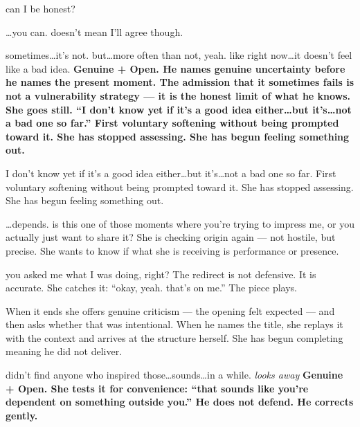 {can I be honest?}
{}

{\ldots you can. doesn't mean I'll agree though.}
{}

{sometimes\ldots it's not. but\ldots more often than not, yeah. 
like right now\ldots it doesn't feel like a bad idea.}
{\textbf{Genuine + Open. He names genuine uncertainty before he names the 
present moment. The admission that it sometimes fails is not a vulnerability 
strategy --- it is the honest limit of what he knows. She goes still. 
``I don't know yet if it's a good idea either\ldots but it's\ldots not a bad 
one so far.'' First voluntary softening without being prompted toward it. 
She has stopped assessing. She has begun feeling something out.}}

{I don't know yet if it's a good idea either\ldots but it's\ldots not a bad 
one so far.}
{First voluntary softening without being prompted toward it. 
She has stopped assessing. She has begun feeling something out.}

\thinrule

{\ldots depends. is this one of those moments where you're trying to impress 
me, or you actually just want to share it?}
{She is checking origin again --- not hostile, but precise. She wants to know 
if what she is receiving is performance or presence.}

{you asked me what I was doing, right?}
{The redirect is not defensive. It is accurate. She catches it: 
``okay, yeah. that's on me.'' The piece plays.}

\thinrule

{When it ends she offers genuine criticism --- the opening felt expected --- 
and then asks whether that was intentional. When he names the title, she 
replays it with the context and arrives at the structure herself. 
She has begun completing meaning he did not deliver.}

\thinrule

{didn't find anyone who inspired those\ldots sounds\ldots in a while. 
\textit{looks away}}
{\textbf{Genuine + Open. She tests it for convenience: ``that sounds like 
you're dependent on something outside you.'' He does not defend. 
He corrects gently.}}


